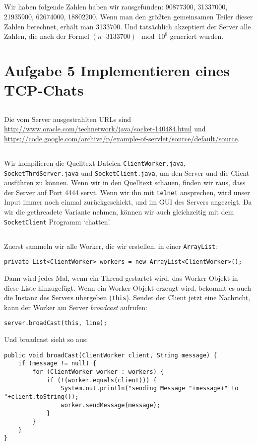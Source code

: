 \documentclass[10pt,a4paper]{article}
\begin{document}
\subsection{}
Wir haben folgende Zahlen haben wir rausgefunden:
90877300,
31337000,
21935900,
62674000,
18802200.
Wenn man den größten gemeinsamen Teiler dieser Zahlen berechnet,
erhält man 3133700. Und tatsächlich akzeptiert der Server alle Zahlen,
die nach der Formel $(n \cdot 3133700) \mod 10^8$ generiert wurden.

\section{Aufgabe 5 Implementieren eines TCP-Chats}
\setcounter{subsection}{0}
\subsection{}
Die vom Server ausgestrahlten URLs sind
\url{http://www.oracle.com/technetwork/java/socket-140484.html} und
\url{https://code.google.com/archive/p/example-of-servlet/source/default/source}.

\subsection{}
Wir kompilieren die Quelltext-Dateien \texttt{ClientWorker.java},
\texttt{SocketThrdServer.java} und \texttt{SocketClient.java},
um den Server und die Client ausführen zu können.
Wenn wir in den Quelltext schauen, finden wir raus, dass der Server
auf Port 4444 servt. Wenn wir ihn mit \texttt{telnet} ansprechen,
wird unser Input immer noch einmal zurückgeschickt, und im GUI des Servers
angezeigt. Da wir die gethreadete Variante nehmen, können wir auch gleichzeitig
mit dem \texttt{SocketClient} Programm `chatten'.

\subsection{}
Zuerst sammeln wir alle Worker, die wir erstellen, in einer
\texttt{ArrayList}:
\begin{verbatim}
private List<ClientWorker> workers = new ArrayList<ClientWorker>();
\end{verbatim}
Dann wird jedes Mal, wenn ein Thread gestartet wird, das Worker Objekt
in diese Liste hinzugefügt.
Wenn ein Worker Objekt erzeugt wird, bekommt es auch die Instanz
des Servers übergeben (\texttt{this}). Sendet der Client jetzt eine Nachricht,
kann der Worker am Server \textit{broadcast} aufrufen:
\begin{verbatim}
server.broadCast(this, line);
\end{verbatim}
\newpage
Und broadcast sieht so aus:
\begin{verbatim}
public void broadCast(ClientWorker client, String message) {
    if (message != null) {
        for (ClientWorker worker : workers) {
            if (!(worker.equals(client))) {
                System.out.println("sending Message "+message+" to "+client.toString());
                worker.sendMessage(message);
            }
        }
    }
}
\end{verbatim}
\end{document}
